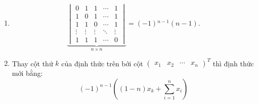 \begin{lemma}
    \begin{enumerate}[label = (\roman*)]
        \item
              \[
                  \underbrace{\begin{vmatrix}
                          0      & 1      & 1      & \cdots & 1      \\
                          1      & 0      & 1      & \cdots & 1      \\
                          1      & 1      & 0      & \cdots & 1      \\
                          \vdots & \vdots & \vdots & \ddots & \vdots \\
                          1      & 1      & 1      & \cdots & 0
                      \end{vmatrix}}_{n\times n}
                  = (-1){}^{n-1}(n-1).
              \]
        \item Thay cột thứ $k$ của định thức trên bởi cột $\begin{pmatrix}x_{1} & x_{2} & \cdots & x_{n} \end{pmatrix}^{T}$ thì định thức mới bằng:
              \[
                  {(-1)}^{n-1}\left((1-n)x_{k} + \sum^{n}_{i=1}x_{i}\right)
              \]
    \end{enumerate}
\end{lemma}

